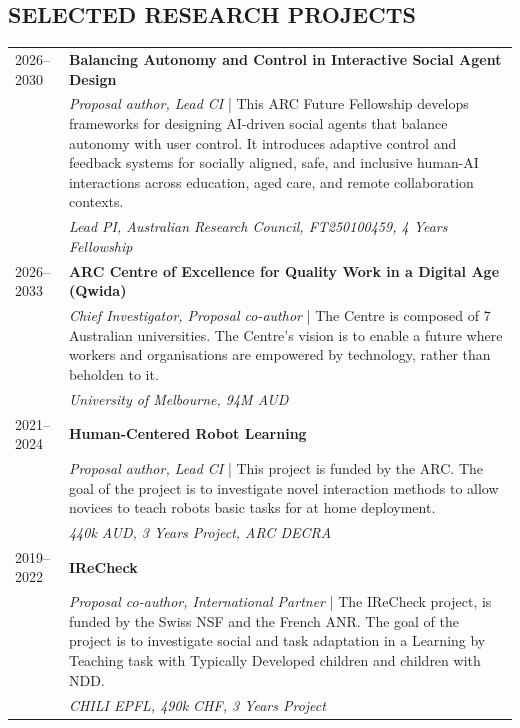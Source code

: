 
\subsection{SELECTED RESEARCH PROJECTS}
\vspace{2pt}

\noindent
\begin{tabularx}{\textwidth}{@{}lX@{}}
2026--2030 & \textbf{Balancing Autonomy and Control in Interactive Social Agent Design} \\
           & \emph{Proposal author, Lead CI} | This ARC Future Fellowship develops frameworks for designing AI-driven social agents that balance autonomy with user control. It introduces adaptive control and feedback systems for socially aligned, safe, and inclusive human-AI interactions across education, aged care, and remote collaboration contexts. \\
           & \textit{Lead PI, Australian Research Council, FT250100459, 4 Years Fellowship} \\[3pt]

2026--2033 & \textbf{ARC Centre of Excellence for Quality Work in a Digital Age (Qwida)} \\
           & \emph{Chief Investigator, Proposal co-author} | The Centre is composed of 7 Australian universities. The Centre's vision is to enable a future where workers and organisations are empowered by technology, rather than beholden to it. \\
           & \textit{University of Melbourne, 94M AUD} \\[3pt]

2021--2024 & \textbf{Human-Centered Robot Learning} \\
           & \emph{Proposal author, Lead CI} | This project is funded by the ARC. The goal of the project is to investigate novel interaction methods to allow novices to teach robots basic tasks for at home deployment. \\
           & \textit{440k AUD, 3 Years Project, ARC DECRA} \\[3pt]

2019--2022 & \textbf{IReCheck} \\
           & \emph{Proposal co-author, International Partner} | The IReCheck project, is funded by the Swiss NSF and the French ANR. The goal of the project is to investigate social and task adaptation in a Learning by Teaching task with Typically Developed children and children with NDD. \\
           & \textit{CHILI EPFL, 490k CHF, 3 Years Project} \\[3pt]


\end{tabularx}
